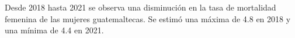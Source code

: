 Desde 2018 hasta 2021 se observa una disminución en la tasa de mortalidad femenina de las mujeres guatemaltecas. Se estimó una máxima de 4.8 en 2018 y una mínima de 4.4 en 2021. 